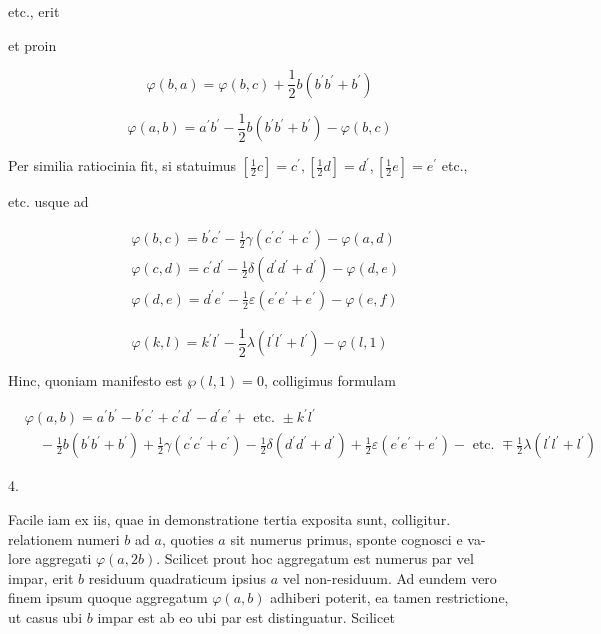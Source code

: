 \documentclass[10pt]{article}
\begin{document}
etc., erit

et proin

\[
\varphi(b, a)=\varphi(b, c)+\frac{1}{2} b\left(b^{\prime} b^{\prime}+b^{\prime}\right)
\]

\[
\varphi(a, b)=a^{\prime} b^{\prime}-\frac{1}{2} b\left(b^{\prime} b^{\prime}+b^{\prime}\right)-\varphi(b, c)
\]

Per similia ratiocinia fit, si statuimus \(\left[\frac{1}{2} c\right]=c^{\prime},\left[\frac{1}{2} d\right]=d^{\prime},\left[\frac{1}{2} e\right]=e^{\prime}\) etc.,

etc. usque ad

\[
\begin{aligned}
& \varphi(b, c)=b^{\prime} c^{\prime}-\frac{1}{2} \gamma\left(c^{\prime} c^{\prime}+c^{\prime}\right)-\varphi(a, d) \\
& \varphi(c, d)=c^{\prime} d^{\prime}-\frac{1}{2} \delta\left(d^{\prime} d^{\prime}+d^{\prime}\right)-\varphi(d, e) \\
& \varphi(d, e)=d^{\prime} e^{\prime}-\frac{1}{2} \varepsilon\left(e^{\prime} e^{\prime}+e^{\prime}\right)-\varphi(e, f)
\end{aligned}
\]

\[
\varphi(k, l)=k^{\prime} l^{\prime}-\frac{1}{2} \lambda\left(l^{\prime} l^{\prime}+l^{\prime}\right)-\varphi(l, 1)
\]

Hinc, quoniam manifesto est \(\wp(l, 1)=0\), colligimus formulam

\[
\begin{aligned}
& \varphi(a, b)=a^{\prime} b^{\prime}-b^{\prime} c^{\prime}+c^{\prime} d^{\prime}-d^{\prime} e^{\prime}+\text { etc. } \pm k^{\prime} l^{\prime} \\
& \quad-\frac{1}{2} b\left(b^{\prime} b^{\prime}+b^{\prime}\right)+\frac{1}{2} \gamma\left(c^{\prime} c^{\prime}+c^{\prime}\right)-\frac{1}{2} \delta\left(d^{\prime} d^{\prime}+d^{\prime}\right)+\frac{1}{2} \varepsilon\left(e^{\prime} e^{\prime}+e^{\prime}\right)-\text { etc. } \mp \frac{1}{2} \lambda\left(l^{\prime} l^{\prime}+l^{\prime}\right)
\end{aligned}
\]

4.

Facile iam ex iis, quae in demonstratione tertia exposita sunt, colligitur. relationem numeri \(b\) ad \(a\), quoties \(a\) sit numerus primus, sponte cognosci e va-
lore aggregati \(\varphi(a, 2 b)\). Scilicet prout hoc aggregatum est numerus par vel impar, erit \(b\) residuum quadraticum ipsius \(a\) vel non-residuum. Ad eundem vero finem ipsum quoque aggregatum \(\varphi(a, b)\) adhiberi poterit, ea tamen restrictione, ut casus ubi \(b\) impar est ab eo ubi par est distinguatur. Scilicet
\end{document}
